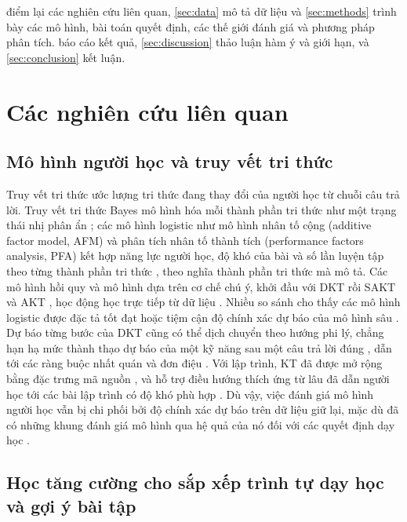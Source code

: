 \documentclass[a4paper,preprint,12pt,authoryear]{elsarticle}
\begin{document}
 điểm lại các nghiên cứu liên quan, \cref{sec:data} mô tả dữ liệu và \cref{sec:methods} trình bày các mô hình, bài toán quyết định, các thế giới đánh giá và phương pháp phân tích.  báo cáo kết quả, \cref{sec:discussion} thảo luận hàm ý và giới hạn, và \cref{sec:conclusion} kết luận.

\section{Các nghiên cứu liên quan}\label{sec:related}

\subsection{Mô hình người học và truy vết tri thức}

Truy vết tri thức ước lượng tri thức đang thay đổi của người học từ chuỗi câu trả lời. Truy vết tri thức Bayes mô hình hóa mỗi thành phần tri thức như một trạng thái nhị phân ẩn \citep{corbett1994bkt}; các mô hình logistic như mô hình nhân tố cộng (additive factor model, AFM) và phân tích nhân tố thành tích (performance factors analysis, PFA) kết hợp năng lực người học, độ khó của bài và số lần luyện tập theo từng thành phần tri thức \citep{cen2006lfa,pavlik2009pfa,pelanek2017learner}, theo nghĩa thành phần tri thức mà \citet{koedinger2012kli} mô tả. Các mô hình hồi quy và mô hình dựa trên cơ chế chú ý, khởi đầu với DKT \citep{piech2015dkt} rồi SAKT và AKT \citep{pandey2019sakt,ghosh2020akt}, học động học trực tiếp từ dữ liệu \citep[xem tổng quan của][]{abdelrahman2023survey}. Nhiều so sánh cho thấy các mô hình logistic được đặc tả tốt đạt hoặc tiệm cận độ chính xác dự báo của mô hình sâu \citep{khajah2016deep,wilson2016basics,gervet2020deep}. Dự báo từng bước của DKT cũng có thể dịch chuyển theo hướng phi lý, chẳng hạn hạ mức thành thạo dự báo của một kỹ năng sau một câu trả lời đúng \citep{yeung2018dktplus}, dẫn tới các ràng buộc nhất quán và đơn điệu \citep{zhang2023cmkt}. Với lập trình, KT đã được mở rộng bằng đặc trưng mã nguồn \citep{shi2022codedkt}, và hỗ trợ điều hướng thích ứng từ lâu đã dẫn người học tới các bài lập trình có độ khó phù hợp \citep{hsiao2010guiding,brusilovsky2007user}. Dù vậy, việc đánh giá mô hình người học vẫn bị chi phối bởi độ chính xác dự báo trên dữ liệu giữ lại, mặc dù đã có những khung đánh giá mô hình qua hệ quả của nó đối với các quyết định dạy học \citep{gonzalezbrenes2015leopard,huang2015multifaceted}.

\subsection{Học tăng cường cho sắp xếp trình tự dạy học và gợi ý bài tập}
\end{document}
